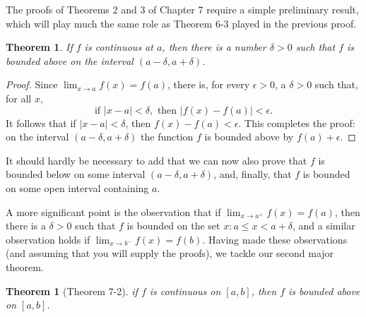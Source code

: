 \documentclass{article}
\newtheorem{theorem}{Theorem}
\newtheorem*{theorem*}{Theorem}
\begin{document}
The proofs of Theorems 2 and 3 of Chapter 7 require a simple preliminary
result, which will play much the same role as Theorem 6-3 played in the
previous proof.

\begin{theorem}
  If $f$ is continuous at $a$, then there is a number $\delta > 0$ such that
  $f$ is bounded above on the interval $(a - \delta, a + \delta)$.
\end{theorem}

\begin{proof}
  Since $\lim_{x \rightarrow a}f(x) = f(a)$, there is, for every $\epsilon >
  0$, a $\delta > 0$ such that, for all $x$, \begin{equation*}
    \text{if } |x - a| < \delta, \text{ then } |f(x) - f(a)| < \epsilon.
  \end{equation*}
  It follows that if $|x - a| < \delta$, then $f(x) - f(a) < \epsilon$. This
  completes the proof: on the interval $(a - \delta, a + \delta)$ the function
  $f$ is bounded above by $f(a) + \epsilon$.
\end{proof}

It should hardly be necessary to add that we can now also prove that $f$ is
bounded below on some interval $(a - \delta, a + \delta)$, and, finally, that
$f$ is bounded on some open interval containing $a$.

A more significant point is the observation that if $\lim_{x \rightarrow a^+}
f(x) = f(a)$, then there is a $\delta > 0$ such that $f$ is bounded on the set
${x: a \leq x < a + \delta}$, and a similar observation holds if $\lim_{x
\rightarrow b^-}f(x) = f(b)$. Having made these observations (and assuming that
you will supply the proofs), we tackle our second major theorem.

\begin{theorem*}[Theorem 7-2]
  if $f$ is continuous on $[a, b]$, then $f$ is bounded above on $[a, b]$.
\end{theorem*}
\end{document}
